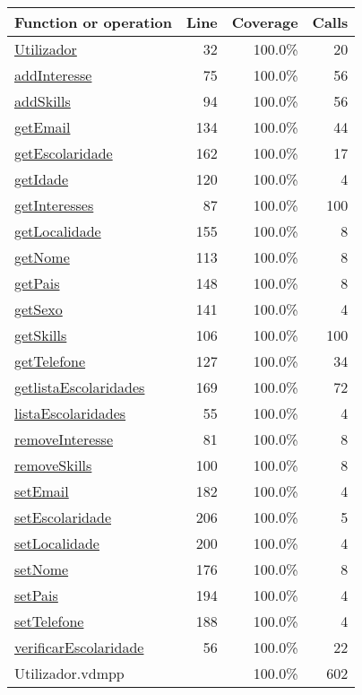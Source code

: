 \begin{longtable}{|l|r|r|r|}
\hline
Function or operation & Line & Coverage & Calls \\
\hline
\hline
\hyperref[Utilizador:32]{Utilizador} & 32&100.0\% & 20 \\
\hline
\hyperref[addInteresse:75]{addInteresse} & 75&100.0\% & 56 \\
\hline
\hyperref[addSkills:94]{addSkills} & 94&100.0\% & 56 \\
\hline
\hyperref[getEmail:134]{getEmail} & 134&100.0\% & 44 \\
\hline
\hyperref[getEscolaridade:162]{getEscolaridade} & 162&100.0\% & 17 \\
\hline
\hyperref[getIdade:120]{getIdade} & 120&100.0\% & 4 \\
\hline
\hyperref[getInteresses:87]{getInteresses} & 87&100.0\% & 100 \\
\hline
\hyperref[getLocalidade:155]{getLocalidade} & 155&100.0\% & 8 \\
\hline
\hyperref[getNome:113]{getNome} & 113&100.0\% & 8 \\
\hline
\hyperref[getPais:148]{getPais} & 148&100.0\% & 8 \\
\hline
\hyperref[getSexo:141]{getSexo} & 141&100.0\% & 4 \\
\hline
\hyperref[getSkills:106]{getSkills} & 106&100.0\% & 100 \\
\hline
\hyperref[getTelefone:127]{getTelefone} & 127&100.0\% & 34 \\
\hline
\hyperref[getlistaEscolaridades:169]{getlistaEscolaridades} & 169&100.0\% & 72 \\
\hline
\hyperref[listaEscolaridades:55]{listaEscolaridades} & 55&100.0\% & 4 \\
\hline
\hyperref[removeInteresse:81]{removeInteresse} & 81&100.0\% & 8 \\
\hline
\hyperref[removeSkills:100]{removeSkills} & 100&100.0\% & 8 \\
\hline
\hyperref[setEmail:182]{setEmail} & 182&100.0\% & 4 \\
\hline
\hyperref[setEscolaridade:206]{setEscolaridade} & 206&100.0\% & 5 \\
\hline
\hyperref[setLocalidade:200]{setLocalidade} & 200&100.0\% & 4 \\
\hline
\hyperref[setNome:176]{setNome} & 176&100.0\% & 8 \\
\hline
\hyperref[setPais:194]{setPais} & 194&100.0\% & 4 \\
\hline
\hyperref[setTelefone:188]{setTelefone} & 188&100.0\% & 4 \\
\hline
\hyperref[verificarEscolaridade:56]{verificarEscolaridade} & 56&100.0\% & 22 \\
\hline
\hline
Utilizador.vdmpp & & 100.0\% & 602 \\
\hline
\end{longtable}

